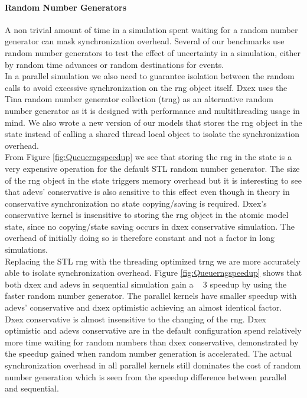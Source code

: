 \paragraph*{Random Number Generators}
A non trivial amount of time in a simulation spent waiting for a random number generator can mask synchronization overhead. Several of our benchmarks use random number generators to test the effect of uncertainty in a simulation, either by random time advances or random destinations for events. \\
In a parallel simulation we also need to guarantee isolation between the random calls to avoid excessive synchronization on the rng object itself. 
Dxex uses the Tina random number generator collection (trng) \cite{PhysRevE.75.066701} as an alternative random number generator as it is designed with performance and multithreading usage in mind. 
We also wrote a new version of our models that stores the rng object in the state instead of calling a shared thread local object to isolate the synchronization overhead.\\
From Figure \ref{fig:Queuerngspeedup} we see that storing the rng in the state is a very expensive operation for the default STL random number generator. The size of the rng object in the state triggers memory overhead but it is interesting to see that adevs' conservative is also sensitive to this effect even though in theory in conservative synchronization no state copying/saving is required. 
Dxex's conservative kernel is insensitive to storing the rng object in the atomic model state, since no copying/state saving occurs in dxex conservative simulation. 
The overhead of initially doing so is therefore constant and not a factor in long simulations.\\
Replacing the STL rng with the threading optimized trng we are more accurately able to isolate synchronization overhead. Figure \ref{fig:Queuerngspeedup} shows that both dxex and adevs in sequential simulation gain a ~ 3 speedup by using the faster random number generator. The parallel kernels have smaller speedup with adevs' conservative and dxex optimistic achieving an almost identical factor. Dxex conservative is almost insensitive to the changing of the rng. 
Dxex optimistic and adevs conservative are in the default configuration spend relatively more time waiting for random numbers than dxex conservative, demonstrated by the speedup gained when random number generation is accelerated.
The actual synchronization overhead in all parallel kernels still dominates the cost of random number generation which is seen from the speedup difference between parallel and sequential.\\
